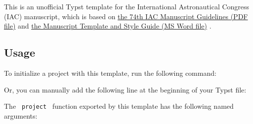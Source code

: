 \label{readme}
This is an unofficial Typst template for the International Astronautical
Congress (IAC) manuscript, which is based on
\href{https://www.iafastro.org/assets/files/IAC\%202023\%20Manuscript\%20Guidelines.pdf}{the
74th IAC Manuscript Guidelines (PDF file)} and
\href{https://www.iafastro.org/assets/files/IAC\%202023_Manuscript-Template.doc}{the
Manuscript Template and Style Guide (MS Word file)} .

\subsection{Usage}\label{usage}

To initialize a project with this template, run the following command:

\begin{Shaded}
\begin{Highlighting}[]
\end{Highlighting}
\end{Shaded}

Or, you can manually add the following line at the beginning of your
Typst file:

\begin{Shaded}
\begin{Highlighting}[]
\end{Highlighting}
\end{Shaded}

The \texttt{\ project\ } function exported by this template has the
following named arguments:

